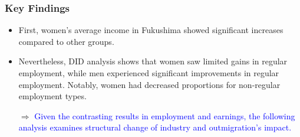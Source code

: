 \documentclass[serif, aspectratio=169]{beamer}
\begin{document}

\begin{frame}[label=summary]
\frametitle{Key Findings}



{\Large
\begin{itemize}
    \item First, women’s average income in Fukushima showed significant increases compared to other groups.
    
    \item Nevertheless, DID analysis shows that women saw limited gains in regular employment, while men experienced significant improvements in regular employment. Notably, women had decreased proportions for non-regular employment types.
    
    \item[$\Rightarrow$] \textcolor{blue}{Given the contrasting results in employment and earnings, the following analysis examines structural change of industry and outmigration's impact.}
\end{itemize}
}
\end{frame}

\end{document}
